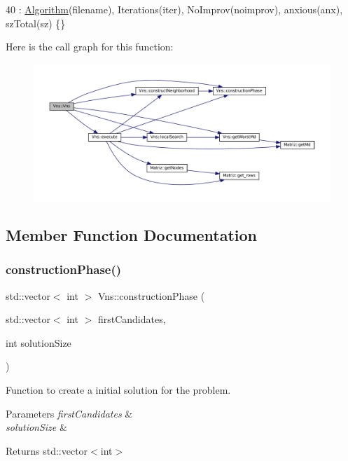 \begin{DoxyCode}
40 : \hyperlink{classAlgorithm_a89df1d2c6751f70733f38daa0ee2a13b}{Algorithm}(filename), Iterations(iter), NoImprov(noimprov), anxious(anx), szTotal(sz) \{\}
\end{DoxyCode}
Here is the call graph for this function\+:\nopagebreak
\begin{figure}[H]
\begin{center}
\leavevmode
\includegraphics[width=350pt]{classVns_a82c0b5f02b3b7c35483e9e0e508e34ae_cgraph}
\end{center}
\end{figure}


\subsection{Member Function Documentation}
\mbox{\label{classVns_aefd9719db68183a6b2ec871c86226ee4}} 
\subsubsection{\texorpdfstring{construction\+Phase()}{constructionPhase()}}
{\footnotesize\ttfamily std\+::vector$<$ int $>$ Vns\+::construction\+Phase (\begin{DoxyParamCaption}\item[{std\+::vector$<$ int $>$}]{first\+Candidates,  }\item[{int}]{solution\+Size }\end{DoxyParamCaption})}



Function to create a initial solution for the problem. 


\begin{DoxyParams}{Parameters}
{\em first\+Candidates} & \\
\hline
{\em solution\+Size} & \\
\hline
\end{DoxyParams}
\begin{DoxyReturn}{Returns}
std\+::vector$<$int$>$ 
\end{DoxyReturn}

